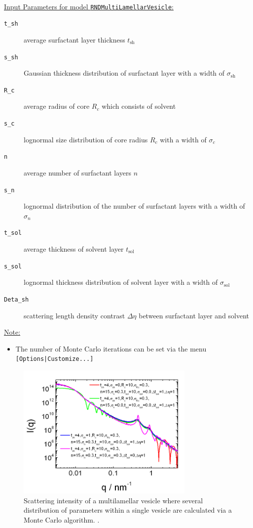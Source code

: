 \hspace{1mm}\\
\uline{Input Parameters for model
\texttt{RNDMultiLamellarVesicle}:}
\begin{description}
\item[\texttt{t\_sh}] average surfactant layer thickness $t_\text{sh}$
\item[\texttt{s\_sh}] Gaussian thickness distribution of surfactant layer with a width of $\sigma_\text{sh}$
\item[\texttt{R\_c}] average radius of core $R_c$ which consists of solvent
\item[\texttt{s\_c}] lognormal size distribution of core radius $R_c$ with a width of $\sigma_c$
\item[\texttt{n}] average number of surfactant layers $n$
\item[\texttt{s\_n}] lognormal distribution of the number of surfactant layers with a width of $\sigma_n$
\item[\texttt{t\_sol}] average thickness of solvent layer $t_\text{sol}$
\item[\texttt{s\_sol}] lognormal thickness distribution of solvent layer with a width of $\sigma_\text{sol}$
\item[\texttt{Deta\_sh}] scattering length density contrast $\Delta\eta$ between surfactant layer and solvent
\end{description}

\noindent\uline{Note:}
\begin{itemize}
\item[~] The number of Monte Carlo iterations can be set via the menu \texttt{[Options|Customize...]}
\end{itemize}

\begin{figure}[htb]
\begin{center}
\includegraphics[width=0.768\textwidth]{../images/form_factor/spheres/random_multilamellar_vesicle_Iq.png}
\end{center}
\caption{Scattering intensity of a multilamellar vesicle where several distribution of parameters
within a single vesicle are calculated via a Monte Carlo algorithm. .}
\label{fig:I_rndMLV}
\end{figure}

